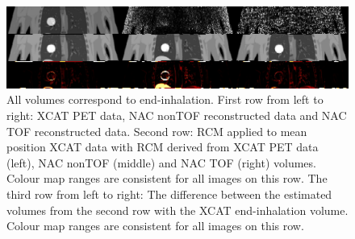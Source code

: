 \documentclass[portrait,color=UCLburgundy,margin=2cm]{uclposter}
\begin{document}
\begin{figure}[b]
    \centering
    \includegraphics[width=0.9\linewidth]{output_flipped.png}
    \caption{All volumes correspond to end-inhalation. First row from left to right: XCAT PET data, NAC nonTOF reconstructed data and NAC TOF reconstructed data. Second row: RCM applied to mean position XCAT data with RCM derived from XCAT PET data (left), NAC nonTOF (middle) and NAC TOF (right) volumes. Colour map ranges are consistent for all images on this row. The third row from left to right: The difference between the estimated volumes from the second row with the XCAT end-inhalation volume. Colour map ranges are consistent for all images on this row.}
    \label{fig:output}
\end{figure}
\end{document}
